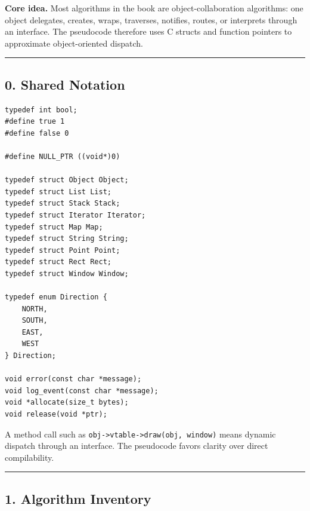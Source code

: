 \documentclass[11pt]{article}
\begin{document}
\textbf{Core idea.} Most algorithms in the book are object-collaboration algorithms: one object delegates, creates, wraps, traverses, notifies, routes, or interprets through an interface. The pseudocode therefore uses C structs and function pointers to approximate object-oriented dispatch.

\begin{center}\rule{0.5\linewidth}{0.5pt}\end{center}

\subsection{0. Shared Notation}\label{shared-notation}

\begin{verbatim}
typedef int bool;
#define true 1
#define false 0

#define NULL_PTR ((void*)0)

typedef struct Object Object;
typedef struct List List;
typedef struct Stack Stack;
typedef struct Iterator Iterator;
typedef struct Map Map;
typedef struct String String;
typedef struct Point Point;
typedef struct Rect Rect;
typedef struct Window Window;

typedef enum Direction {
    NORTH,
    SOUTH,
    EAST,
    WEST
} Direction;

void error(const char *message);
void log_event(const char *message);
void *allocate(size_t bytes);
void release(void *ptr);
\end{verbatim}

A method call such as \texttt{obj->vtable->draw(obj, window)} means dynamic dispatch through an interface. The pseudocode favors clarity over direct compilability.

\begin{center}\rule{0.5\linewidth}{0.5pt}\end{center}

\subsection{1. Algorithm Inventory}\label{algorithm-inventory}
\end{document}

